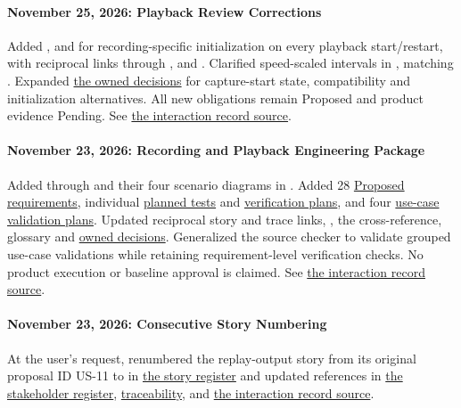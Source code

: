 \paragraph{November 25, 2026: Playback Review Corrections}
Added ,  and  for recording-specific initialization on every playback start/restart, with reciprocal links through ,  and . Clarified speed-scaled intervals in , matching . Expanded \hyperref[Section:RecordingPlaybackDecisions]{the owned decisions} for capture-start state, compatibility and initialization alternatives. All new obligations remain Proposed and product evidence Pending. See \href{s8sAIPromptLog.tex}{the interaction record source}.

\paragraph{November 23, 2026: Recording and Playback Engineering Package}
Added  through  and their four scenario diagrams in . Added 28 \hyperref[Table:RecordingPlaybackRequirements]{Proposed requirements}, individual \hyperref[Table:RecordingPlaybackTests]{planned tests} and \hyperref[Table:RecordingPlaybackVerification]{verification plans}, and four \hyperref[Table:RecordingPlaybackValidation]{use-case validation plans}. Updated reciprocal story and trace links, , the  cross-reference, glossary and \hyperref[Section:RecordingPlaybackDecisions]{owned decisions}. Generalized the source checker to validate grouped use-case validations while retaining requirement-level verification checks. No product execution or baseline approval is claimed. See \href{s8sAIPromptLog.tex}{the interaction record source}.

\paragraph{November 23, 2026: Consecutive Story Numbering}
At the user's request, renumbered the replay-output story from its original
proposal ID US-11 to  in
\hyperref[Table:UserStories]{the story register} and updated references in
\hyperref[Table:StakeholderNeeds]{the stakeholder register},
\hyperref[Section:RecordingPlaybackTraceGaps]{traceability}, and
\href{s8sAIPromptLog.tex}{the interaction record source}.

